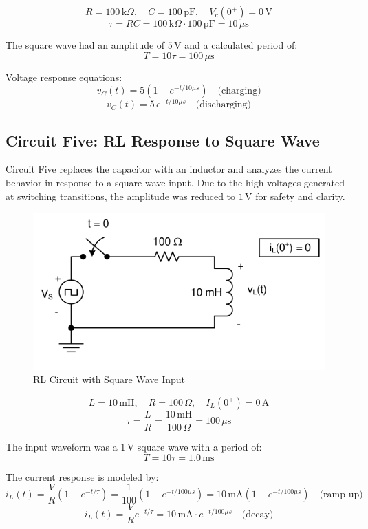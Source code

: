 \documentclass[12pt]{article}
\begin{document}
\[
	R = 100\,\mathrm{k}\Omega, \quad C = 100\,\mathrm{pF}, \quad V_c(0^+) = 0\,\mathrm{V}
\]
\[
	\tau = RC = 100\,\mathrm{k}\Omega \cdot 100\,\mathrm{pF} = 10\,\mu\mathrm{s}
\]

The square wave had an amplitude of $5\,\mathrm{V}$ and a calculated period of:
\[
	T = 10\tau = 100\,\mu\mathrm{s}
\]

Voltage response equations:
\[
	v_C(t) = 5\left(1 - e^{-t/10\mu s}\right) \quad \text{(charging)}
\]
\[
	v_C(t) = 5\,e^{-t/10\mu s} \quad \text{(discharging)}
\]

\subsection{Circuit Five: RL Response to Square Wave}
Circuit Five replaces the capacitor with an inductor and analyzes the current behavior in response to a square wave input. Due to the high voltages generated at switching transitions, the amplitude was reduced to $1\,\mathrm{V}$ for safety and clarity.

\begin{figure}[H]
	\centering
	\includegraphics[width=14cm]{e5_5}
	\caption{RL Circuit with Square Wave Input}
	\label{fig:circuit5}
\end{figure}

\[
	L = 10\,\mathrm{mH}, \quad R = 100\,\Omega, \quad I_L(0^+) = 0\,\mathrm{A}
\]
\[
	\tau = \frac{L}{R} = \frac{10\,\mathrm{mH}}{100\,\Omega} = 100\,\mu\mathrm{s}
\]

The input waveform was a $1\,\mathrm{V}$ square wave with a period of:
\[
	T = 10\tau = 1.0\,\mathrm{ms}
\]

The current response is modeled by:
\[
	i_L(t) = \frac{V}{R}\left(1 - e^{-t/\tau}\right) = \frac{1}{100}\left(1 - e^{-t/100\mu s}\right) = 10\,\mathrm{mA}\left(1 - e^{-t/100\mu s}\right) \quad \text{(ramp-up)}
\]
\[
	i_L(t) = \frac{V}{R} e^{-t/\tau} = 10\,\mathrm{mA} \cdot e^{-t/100\mu s} \quad \text{(decay)}
\]
\end{document}
